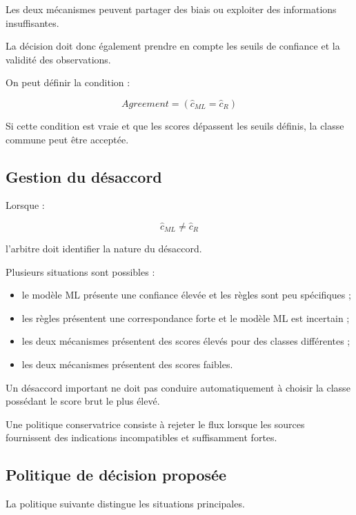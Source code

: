 Les deux mécanismes peuvent partager des biais ou exploiter des informations insuffisantes.

La décision doit donc également prendre en compte les seuils de confiance et la validité des observations.

On peut définir la condition :

\[
Agreement=
(\hat{c}_{ML}=\hat{c}_R)
\]

Si cette condition est vraie et que les scores dépassent les seuils définis, la classe commune peut être acceptée.

\subsection{Gestion du désaccord}

Lorsque :

\[
\hat{c}_{ML}\neq\hat{c}_R
\]

l'arbitre doit identifier la nature du désaccord.

Plusieurs situations sont possibles :

\begin{itemize}
    \item le modèle ML présente une confiance élevée et les règles sont peu spécifiques ;
    \item les règles présentent une correspondance forte et le modèle ML est incertain ;
    \item les deux mécanismes présentent des scores élevés pour des classes différentes ;
    \item les deux mécanismes présentent des scores faibles.
\end{itemize}

Un désaccord important ne doit pas conduire automatiquement à choisir la classe possédant le score brut le plus élevé.

Une politique conservatrice consiste à rejeter le flux lorsque les sources fournissent des indications incompatibles et suffisamment fortes.

\subsection{Politique de décision proposée}

La politique suivante distingue les situations principales.


